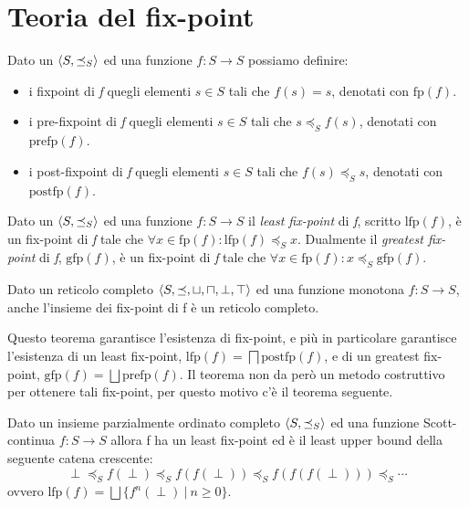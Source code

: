 \section{Teoria del fix-point}

\begin{definition}
Dato un \(\langle S, \preceq_{S}\rangle\) ed una funzione \(f:S\rightarrow S\) possiamo definire:
\begin{itemize}
\setlength\itemsep{0em}
	\item i fixpoint di \emph{f} quegli elementi \(s\in S\) tali che \(f(s)=s\), denotati con \(\textrm{fp}(f)\).
	\item i pre-fixpoint di \emph{f} quegli elementi \(s\in S\) tali che \(s\preceq_S f(s)\), denotati con \(\textrm{prefp}(f)\).
	\item i post-fixpoint di \emph{f} quegli elementi \(s\in S\) tali che \(f(s)\preceq_S s\), denotati con \(\textrm{postfp}(f)\).
\end{itemize}
\end{definition}

\begin{definition}
Dato un \(\langle S, \preceq_{S}\rangle\) ed una funzione \(f:S\rightarrow S\) il \textit{least fix-point} di \textit{f}, scritto \(\textrm{lfp}(f)\), è un fix-point di \textit{f} tale che \(\forall x\in\textrm{fp}(f):\textrm{lfp}(f)\preceq_S x\). Dualmente il \textit{greatest fix-point} di \textit{f}, \(\textrm{gfp}(f)\), è un fix-point di \textit{f} tale che \(\forall x\in\textrm{fp}(f):x\preceq_S \textrm{gfp}(f)\).
\end{definition}

\begin{theorem}
Dato un reticolo completo \(\langle S, \preceq,\sqcup, \sqcap, \perp, \top\rangle\) ed una funzione monotona \(f:S\rightarrow S\), anche l'insieme dei fix-point di f è un reticolo completo. 
\end{theorem}

Questo teorema garantisce l'esistenza di fix-point, e più in particolare garantisce l'esistenza di un least fix-point, \(\textrm{lfp}(f)=\bigsqcap\textrm{postfp}(f)\), e di un greatest fix-point, \(\textrm{gfp}(f)=\bigsqcup\textrm{prefp}(f)\). Il teorema non da però un metodo costruttivo per ottenere tali fix-point, per questo motivo c'è il teorema seguente.

\begin{theorem}\label{teo:kleeneFixPoint}
Dato un insieme parzialmente ordinato completo \(\langle S, \preceq_{S}\rangle\) ed una funzione Scott-continua \(f:S\rightarrow S\) allora f ha un least fix-point ed è il least upper bound della seguente catena crescente:
\[\perp\preceq_S f(\perp) \preceq_S f(f(\perp)) \preceq_S f(f(f(\perp))) \preceq_S \cdots\]
ovvero \(\textrm{lfp}(f)=\bigsqcup\{f^n(\perp)\ |\ n\geq 0\}\).
\end{theorem}

